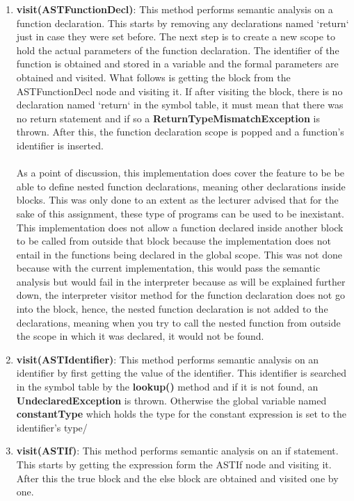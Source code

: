 \documentclass{article}
\begin{document}
\begin{enumerate}
					\item \textbf{visit(ASTFunctionDecl)}: This method performs semantic analysis on a function declaration. This starts by removing any declarations named `return` just in case they were set before. The next step is to create a new scope to hold the actual parameters of the function declaration. The identifier of the function is obtained and stored in a variable and the formal parameters are obtained and visited. What follows is getting the block from the ASTFunctionDecl node and visiting it. If after visiting the block, there is no declaration named `return` in the symbol table, it must mean that there was no return statement and if so a \textbf{ReturnTypeMismatchException} is thrown. After this, the function declaration scope is popped and a function's identifier is inserted. \\\\
					As a point of discussion, this implementation does cover the feature to be be able to define nested function declarations, meaning other declarations inside blocks. This was only done to an extent as the lecturer advised that for the sake of this assignment, these type of programs can be used to be inexistant. This implementation does not allow a function declared inside another block to be called from outside that block because the implementation does not entail in the functions being declared in the global scope. This was not done because with the current implementation, this would pass the semantic analysis but would fail in the interpreter because as will be explained further down, the interpreter visitor method for the function declaration does not go into the block, hence, the nested function declaration is not added to the declarations, meaning when you try to call the nested function from outside the scope in which it was declared, it would not be found.
			
					\item \textbf{visit(ASTIdentifier)}: This method performs semantic analysis on an identifier by first getting the value of the identifier. This identifier is searched in the symbol table by the \textbf{lookup()} method and if it is not found, an \textbf{UndeclaredException} is thrown. Otherwise the global variable named \textbf{constantType} which holds the type for the constant expression is set to the identifier's type/
					
							\item \textbf{visit(ASTIf)}: This method performs semantic analysis on an if statement. This starts by getting the expression form the ASTIf node and visiting it. After this the true block and the else block are obtained and visited one by one.
							

\end{enumerate}
\end{document}
